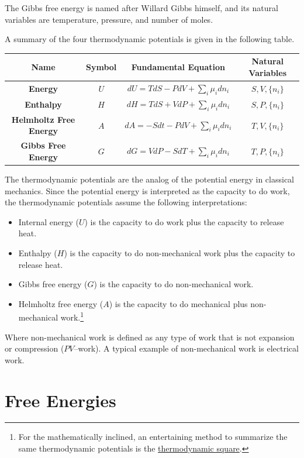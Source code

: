 \documentclass[
  9pt,
]{extbook}
\providecommand{\tightlist}{%
  \setlength{\itemsep}{0pt}\setlength{\parskip}{0pt}}
\theoremstyle{definition}
\theoremstyle{definition}
\theoremstyle{definition}
\theoremstyle{remark}
\begin{document}
The Gibbs free energy is named after Willard Gibbs himself, and its natural variables are temperature, pressure, and number of moles.

A summary of the four thermodynamic potentials is given in the following table.

\tiny

\begin{longtable}[]{@{}cccc@{}}
\toprule
\textbf{Name} & \textbf{Symbol} & \textbf{Fundamental Equation} & \textbf{Natural Variables}\tabularnewline
\midrule
\endhead
\textbf{Energy} & \(U\) & \(dU=TdS-PdV+\sum_i\mu_i dn_i\) & \(S,V,\{n_i\}\)\tabularnewline
\textbf{Enthalpy} & \(H\) & \(dH=TdS+VdP+\sum_i\mu_i dn_i\) & \(S,P,\{n_i\}\)\tabularnewline
\textbf{Helmholtz Free Energy} & \(A\) & \(dA=-Sdt-PdV+\sum_i\mu_i dn_i\) & \(T,V,\{n_i\}\)\tabularnewline
\textbf{Gibbs Free Energy} & \(G\) & \(dG=VdP-SdT+\sum_i\mu_i dn_i\) & \(T,P,\{n_i\}\)\tabularnewline
\bottomrule
\end{longtable}

\normalsize

The thermodynamic potentials are the analog of the potential energy in classical mechanics. Since the potential energy is interpreted as the capacity to do work, the thermodynamic potentials assume the following interpretations:

\begin{itemize}
\tightlist
\item
  Internal energy (\(U\)) is the capacity to do work plus the capacity to release heat.
\item
  Enthalpy (\(H\)) is the capacity to do non-mechanical work plus the capacity to release heat.
\item
  Gibbs free energy (\(G\)) is the capacity to do non-mechanical work.
\item
  Helmholtz free energy (\(A\)) is the capacity to do mechanical plus non-mechanical work.\footnote{For the mathematically inclined, an entertaining method to summarize the same thermodynamic potentials is the \href{https://en.wikipedia.org/wiki/Thermodynamic_square}{thermodynamic square}.}
\end{itemize}

Where non-mechanical work is defined as any type of work that is not expansion or compression (\(PV\)--work). A typical example of non-mechanical work is electrical work.

\hypertarget{freeenergies}{%
\section{Free Energies}\label{freeenergies}}
\end{document}
